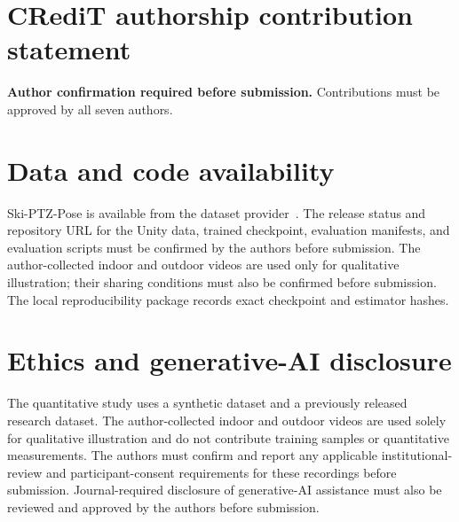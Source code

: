\documentclass[preprint,12pt]{elsarticle}
\begin{document}
\section*{CRediT authorship contribution statement}
\textbf{Author confirmation required before submission.} Contributions must be approved by all seven authors.

\section*{Data and code availability}
Ski-PTZ-Pose is available from the dataset provider~\cite{ski_poseptz_dataset}. The release status and repository URL for the Unity data, trained checkpoint, evaluation manifests, and evaluation scripts must be confirmed by the authors before submission. The author-collected indoor and outdoor videos are used only for qualitative illustration; their sharing conditions must also be confirmed before submission. The local reproducibility package records exact checkpoint and estimator hashes.

\section*{Ethics and generative-AI disclosure}
The quantitative study uses a synthetic dataset and a previously released research dataset. The author-collected indoor and outdoor videos are used solely for qualitative illustration and do not contribute training samples or quantitative measurements. The authors must confirm and report any applicable institutional-review and participant-consent requirements for these recordings before submission. Journal-required disclosure of generative-AI assistance must also be reviewed and approved by the authors before submission.

\setlength{\bibsep}{4pt}


\end{document}
